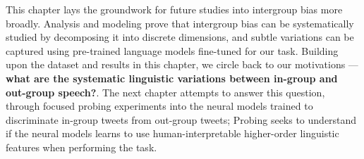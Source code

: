 This chapter lays the groundwork for future studies into intergroup bias more broadly. Analysis and modeling prove that intergroup bias can be systematically studied by decomposing it into discrete dimensions, and subtle variations can be captured using pre-trained language models fine-tuned for our task. Building upon the dataset and results in this chapter, we circle back to our motivations --- \textbf{what are the systematic linguistic variations between in-group and out-group speech?}. The next chapter attempts to answer this question, through focused probing experiments into the neural models trained to discriminate in-group tweets from out-group tweets; Probing seeks to understand if the neural models learns to use human-interpretable higher-order linguistic features when performing the task.

